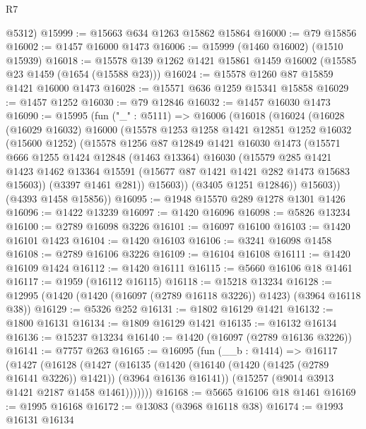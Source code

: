 \begin{lexlean}{R7}
\begin{coremodule}
      @5312)
@15999 := @15663 @634 @1263 @15862 @15864
@16000 := @79 @15856
@16002 := @1457 @16000 @1473
@16006 := @15999 (@1460 @16002) (@1510 @15939)
@16018 := @15578 @139 @1262 @1421 @15861 @1459 @16002 (@15585 @23 @1459 (@1654 (@15588 @23)))
@16024 := @15578 @1260 @87 @15859 @1421 @16000 @1473
@16028 := @15571 @636 @1259 @15341 @15858
@16029 := @1457 @1252
@16030 := @79 @12846
@16032 := @1457 @16030 @1473
@16090 := @15995
    (fun ("_" : @5111) =>
    @16006
      (@16018
        (@16024
          (@16028
            (@16029 @16032)
            @16000
            (@15578
              @1253
              @1258
              @1421
              @12851
              @1252
              @16032
              (@15600 @1252)
              (@15578
                @1256
                @87
                @12849
                @1421
                @16030
                @1473
                (@15571
                  @666
                  @1255
                  @1424
                  @12848
                  (@1463 @13364)
                  @16030
                  (@15579
                    @285
                    @1421
                    @1423
                    @1462
                    @13364
                    @15591
                    (@15677 @87 @1421 @1421 @282 @1473 @15683 @15603))
                  (@3397 @1461 @281))
                @15603))
            (@3405 @1251 @12846))
          @15603))
      (@4393 @1458 @15856))
@16095 := @1948 @15570 @289 @1278 @1301 @1426
@16096 := @1422 @13239
@16097 := @1420 @16096
@16098 := @5826 @13234
@16100 := @2789 @16098 @3226
@16101 := @16097 @16100
@16103 := @1420 @16101 @1423
@16104 := @1420 @16103
@16106 := @3241 @16098 @1458
@16108 := @2789 @16106 @3226
@16109 := @16104 @16108
@16111 := @1420 @16109 @1424
@16112 := @1420 @16111
@16115 := @5660 @16106 @18 @1461
@16117 := @1959 (@16112 @16115)
@16118 := @15218 @13234
@16128 := @12995 (@1420 (@1420 (@16097 (@2789 @16118 @3226)) @1423) (@3964 @16118 @38))
@16129 := @5326 @252
@16131 := @1802 @16129 @1421
@16132 := @1800 @16131
@16134 := @1809 @16129 @1421
@16135 := @16132 @16134
@16136 := @15237 @13234
@16140 := @1420 (@16097 (@2789 @16136 @3226))
@16141 := @7757 @263
@16165 := @16095
    (fun (__b : @1414) =>
    @16117
      (@1427
        (@16128
          (@1427
            (@16135
              (@1420 (@16140 (@1420 (@1425 (@2789 @16141 @3226)) @1421)) (@3964 @16136 @16141))
              (@15257 (@9014 @3913 @1421 @2187 @1458 @1461)))))))
@16168 := @5665 @16106 @18 @1461
@16169 := @1995 @16168
@16172 := @13083 (@3968 @16118 @38)
@16174 := @1993 @16131 @16134

\end{coremodule}
\end{lexlean}
